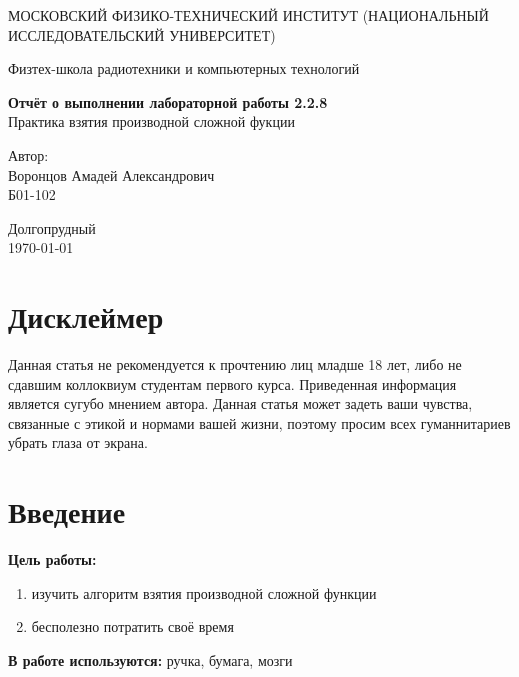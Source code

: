 \documentclass[a4paper,12pt]{article} %
\date{\today}
\begin{document}
\begin{titlepage}
	\begin{center}
		{\large МОСКОВСКИЙ ФИЗИКО-ТЕХНИЧЕСКИЙ ИНСТИТУТ (НАЦИОНАЛЬНЫЙ ИССЛЕДОВАТЕЛЬСКИЙ УНИВЕРСИТЕТ)}
	\end{center}
	\begin{center}
		{\large Физтех-школа радиотехники и компьютерных технологий}
	\end{center}
	
	
	\vspace{4.5cm}
	{\huge
		\begin{center}
			{\bf Отчёт о выполнении лабораторной работы 2.2.8}\\
			Практика взятия производной сложной фукции
		\end{center}
	}
	\vspace{2cm}
	\begin{flushright}
		{\LARGE Автор:\\ Воронцов Амадей Александрович \\
			\vspace{0.2cm}
			Б01-102}
	\end{flushright}
	\vspace{8cm}
	\begin{center}
		Долгопрудный\\
		\today
	\end{center}
\end{titlepage}

\section{Дисклеймер}
Данная статья не рекомендуется к прочтению лиц младше 18 лет, либо не сдавшим коллоквиум студентам первого курса. Приведенная информация является сугубо мнением автора. Данная статья может задеть ваши чувства, связанные с этикой и нормами вашей жизни, поэтому просим всех гуманнитариев убрать глаза от экрана. 

\section{Введение}
\textbf{Цель работы:}  \begin{enumerate}
	\item изучить алгоритм взятия производной сложной функции
	\item бесполезно потратить своё время
\end{enumerate}

\textbf{В работе используются:} ручка, бумага, мозги
\end{document}
